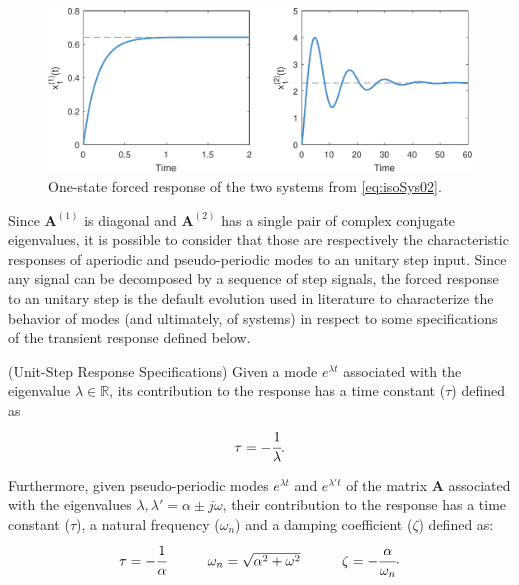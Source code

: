 \documentclass[a4paper,11pt]{book}
\numberwithin{figure}{chapter}
\numberwithin{equation}{chapter}
\numberwithin{table}{chapter}
\theoremstyle{definition}
\newtheorem{definition}{Definition}[chapter]
\newcounter{boxed-theorem}
\newcounter{boxed-definition}
\newenvironment{boxed-definition}[1]
{\colorlet{shadecolor}{pastelYellow!15} \begin{shaded} \begin{definition}{#1}}
{\end{definition} \end{shaded}}
\newcounter{boxed-example}
\begin{document}
\begin{figure}[ht]
    \centering
    \includegraphics[width=\textwidth]{chapter2/forcedResponse}
    \caption{One-state forced response of the two systems from \eqref{eq:isoSys02}.}
    \label{fig:forcedResponse}
\end{figure}

Since $\bm{A}^{(1)}$ is diagonal and $\bm{A}^{(2)}$ has a single pair of complex conjugate eigenvalues, it is possible to consider that those are respectively the characteristic responses of aperiodic and pseudo-periodic modes to an unitary step input. Since any signal can be decomposed by a sequence of step signals, the forced response to an unitary step is the default evolution used in literature to characterize the behavior of modes (and ultimately, of systems) in respect to some specifications of the transient response defined below.

\begin{boxed-definition}{(Unit-Step Response Specifications)} \label{def:responseParameters}
    Given a mode $e^{\lambda t}$ associated with the eigenvalue $\lambda \in \mathbb{R}$, its contribution to the response has a time constant ($\tau$) defined as
    \begin{equation}
        \tau = - \cfrac{1}{\lambda}
    .\end{equation}  
    
    Furthermore, given pseudo-periodic modes $e^{\lambda t}$ and $e^{\lambda' t}$ of the matrix $\bm{A}$ associated with the eigenvalues $\lambda,\lambda' = \alpha \pm j \omega$, their contribution to the response has a time constant ($\tau$), a natural frequency ($\omega_n$) and a damping coefficient ($\zeta$) defined as:
    \begin{equation}
    \begin{matrix}
        \tau = - \cfrac{1}{\alpha} & & & \omega_n = \sqrt{\alpha^2 + \omega^2} & & & \zeta = - \cfrac{\alpha}{\omega_n}
    \end{matrix}
    .\end{equation}
    
\end{boxed-definition}   
\end{document}

